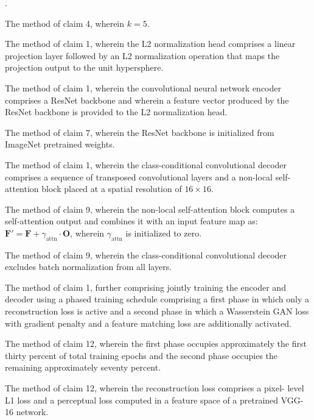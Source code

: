 \documentclass[12pt,letterpaper]{article}
\newcounter{claimnum}
\newenvironment{claims}{%
  \setcounter{claimnum}{0}
  \begin{list}{\arabic{claimnum}.}{%
    \usecounter{claimnum}
    \setlength{\leftmargin}{2em}
    \setlength{\labelsep}{0.5em}
    \setlength{\itemsep}{0pt}
    \setlength{\parsep}{6pt plus 2pt}
  }%
}{\end{list}}
\begin{document}
\begin{claims}
\item The method of claim 4, wherein $k = 5$.

\item The method of claim 1, wherein the L2 normalization head comprises a
linear projection layer followed by an L2 normalization operation that maps
the projection output to the unit hypersphere.

\item The method of claim 1, wherein the convolutional neural network encoder
comprises a ResNet backbone and wherein a feature vector produced by the
ResNet backbone is provided to the L2 normalization head.

\item The method of claim 7, wherein the ResNet backbone is initialized from
ImageNet pretrained weights.

\item The method of claim 1, wherein the class-conditional convolutional decoder
comprises a sequence of transposed convolutional layers and a non-local
self-attention block placed at a spatial resolution of $16 \times 16$.

\item The method of claim 9, wherein the non-local self-attention block
computes a self-attention output and combines it with an input feature map
as: $\mathbf{F}' = \mathbf{F} + \gamma_{\text{attn}} \cdot \mathbf{O}$,
wherein $\gamma_{\text{attn}}$ is initialized to zero.

\item The method of claim 9, wherein the class-conditional convolutional decoder
excludes batch normalization from all layers.

\item The method of claim 1, further comprising jointly training the encoder
and decoder using a phased training schedule comprising a first phase in which
only a reconstruction loss is active and a second phase in which a Wasserstein
GAN loss with gradient penalty and a feature matching loss are additionally
activated.

\item The method of claim 12, wherein the first phase occupies approximately
the first thirty percent of total training epochs and the second phase occupies
the remaining approximately seventy percent.

\item The method of claim 12, wherein the reconstruction loss comprises a pixel-
level L1 loss and a perceptual loss computed in a feature space of a pretrained
VGG-16 network.


\end{claims}
\end{document}
